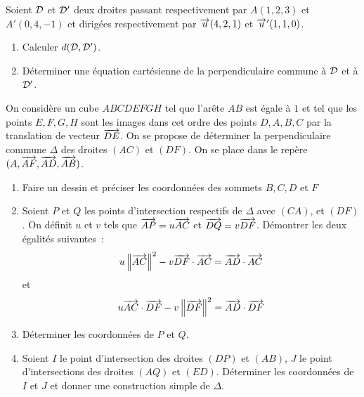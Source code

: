 \begin{exercice}
    Soient \(\mathcal{D}\) et \(\mathcal{D}'\) deux droites passant respectivement par \(A(1,2,3)\) et \(A'(0,4,-1)\) et dirigées respectivement par \(\overrightarrow{u}(4,2,1)\) et \(\overrightarrow{u}'(1,1,0)\).
    \begin{enumerate}
        \item Calculer \(d(\mathcal{D},\mathcal{D}')\).
        \item Déterminer une équation cartésienne de la perpendiculaire commune à \(\mathcal{D}\) et à \(\mathcal{D}'\).
    \end{enumerate}
\end{exercice}
\begin{exercice}
    On considère un cube \(ABCDEFGH\) tel que l'arête \(AB\) est égale à \(1\) et tel que les points \(E, F, G, H\) sont les images dans cet ordre des points \(D, A, B, C\) par la translation de vecteur \(\overrightarrow{DE}\). On se propose de déterminer la perpendiculaire commune \(\Delta\) des droites \((AC)\) et \((DF)\). On se place dans le repère \((A, \overrightarrow{AF}, \overrightarrow{AD}, \overrightarrow{AB})\).
    \begin{enumerate}
        \item Faire un dessin et préciser les coordonnées des sommets \(B, C, D\) et \(F\)
        \item Soient \(P\) et \(Q\) les points d'intersection respectifs de \(\Delta\) avec \((CA)\), et \((DF)\). On définit \(u\) et \(v\) tels que \(\overrightarrow{AP} = u \overrightarrow{AC}\) et \(\overrightarrow{DQ} = v \overrightarrow{DF}\). Démontrer les deux égalités suivantes~: \[u \left\lVert\overrightarrow{AC}\right\rVert^2 -v \overrightarrow{DF}\cdot\overrightarrow{AC} = \overrightarrow{AD}\cdot\overrightarrow{AC}\] et \[u \overrightarrow{AC}\cdot\overrightarrow{DF} - v\left\lVert\overrightarrow{DF}\right\rVert^2= \overrightarrow{AD}\cdot\overrightarrow{DF}\]
        \item Déterminer les coordonnées de \(P\) et \(Q\).
        \item Soient \(I\) le point d'intersection des droites \((DP)\) et \((AB)\), \(J\) le point d'intersections des droites \((AQ)\) et \((ED)\). Déterminer les coordonnées de \(I\) et \(J\) et donner une construction simple de \(\Delta\).
    \end{enumerate}
\end{exercice}
